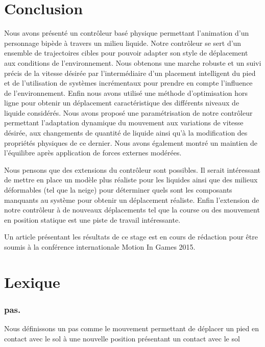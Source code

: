 \documentclass[runningheads,a4paper]{llncs}
\begin{document}
\section{Conclusion}
\label{sec:conclusion}
%
Nous avons présenté un contrôleur basé physique permettant l'animation d'un personnage bipède à travers un milieu liquide. Notre contrôleur se sert d'un ensemble de trajectoires cibles pour pouvoir adapter son style de déplacement aux conditions de l'environnement. Nous obtenons une marche robuste et un suivi précis de la vitesse désirée par l'intermédiaire d'un placement intelligent du pied et de l'utilisation de systèmes incrémentaux pour prendre en compte l'influence de l'environnement. Enfin nous avons utilisé une méthode d'optimisation hors ligne pour obtenir un déplacement caractéristique des différents niveaux de liquide considérés.
Nous avons proposé une paramétrisation de notre contrôleur permettant l'adaptation dynamique du mouvement aux variations de vitesse désirée, aux changements de quantité de liquide ainsi qu'à la modification des propriétés physiques de ce dernier. Nous avons également montré un maintien de l'équilibre après application de forces externes modérées.

Nous pensons que des extensions du contrôleur sont possibles. Il serait intéressant de mettre en place un modèle plus réaliste pour les liquides ainsi que des milieux déformables (tel que la neige) pour déterminer quels sont les composants manquants au système pour obtenir un déplacement réaliste. Enfin l'extension de notre contrôleur à de nouveaux déplacements tel que la course ou des mouvement en position statique est une piste de travail intéressante. 

Un article présentant les résultats de ce stage est en cours de rédaction pour être soumis à la conférence internationale Motion In Games 2015.
%



%
\nocite{*}


%
\newpage

\appendix
\section{Lexique}
\label{sec:lexique}
\subsubsection{pas.} Nous définissons un pas comme le mouvement permettant de déplacer un pied en contact avec le sol à une nouvelle position présentant un contact avec le sol
\end{document}
